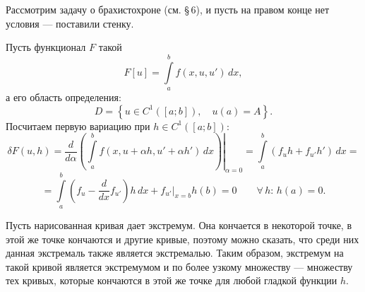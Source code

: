\documentclass[12pt,a5paper]{book}
\begin{document}
	Рассмотрим задачу о брахистохроне (см. \S\,6), и пусть на правом конце нет условия --- поставили стенку.
	\begin{center}
	\end{center}
	Пусть функционал $F$ такой
	\begin{equation*}
		F[u] = \int\limits_a^b f(x, u, u')\,dx,
	\end{equation*}
	а его область определения:
	\begin{equation*}
		D = \left\{u \in C^1([a;b]), \quad u(a) = A\right\}.
	\end{equation*}
	Посчитаем первую вариацию при $h \in C^1([a;b])$:
	\begin{equation*}
		\delta F(u,h) = \left.\frac{d}{d\alpha}\left(\int\limits_a^b f(x, u + \alpha h, u' + \alpha h')\,dx\right)\right|_{\alpha=0} = \int\limits_a^b \left(f_uh + f_{u'}h'\right)\,dx =
	\end{equation*}
	\begin{equation*}
		= \int\limits_a^b\left(f_u - \frac{d}{dx}f_{u'}\right)h\,dx + \left.f_{u'}\right|_{x=b}h(b) = 0 \qquad \forall\,h:\, h(a) = 0.
	\end{equation*}
	
	Пусть нарисованная кривая дает экстремум. Она кончается в некоторой точке, в этой же точке кончаются и другие кривые, поэтому можно сказать, что среди них данная экстремаль также является экстремалью. Таким образом, экстремум на такой кривой является экстремумом и по более узкому множеству --- множеству тех кривых, которые кончаются в этой же точке для любой гладкой функции $h$.
	
\end{document}

